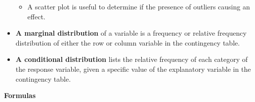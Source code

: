\documentclass{report}
\begin{document}
\begin{itemize}
          \begin{itemize}
            \item A scatter plot is useful to determine if the presence of outliers causing an effect.
          \end{itemize}
        \item \textbf{A marginal distribution} of a variable is a frequency or relative frequency distribution of either the row or column variable in the contingency table.
        \item \textbf{A conditional distribution} lists the relative frequency of each category of the response variable, given a specific value of the explanatory variable in the contingency table.
        \end{itemize}


        \pagebreak \bigbreak \noindent
        \begin{large}
          \textbf{Formulas}
        \end{large}
        \bigbreak \noindent 
\end{document}
